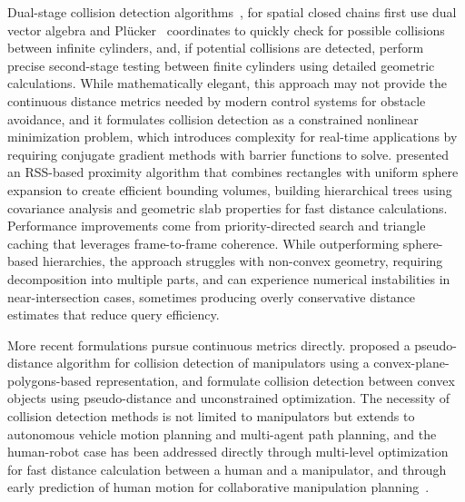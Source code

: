 Dual-stage collision detection algorithms~\cite{ketchel2008self}, for spatial closed chains first use dual vector algebra and Pl\"ucker~\citep{miller2005plucker} coordinates to quickly check for possible collisions between infinite cylinders, and, if potential collisions are detected, perform precise second-stage testing between finite cylinders using detailed geometric calculations. While mathematically elegant, this approach may not provide the continuous distance metrics needed by modern control systems for obstacle avoidance, and it formulates collision detection as a constrained nonlinear minimization problem, which introduces complexity for real-time applications by requiring conjugate gradient methods with barrier functions to solve. \citet{larsen2000fast} presented an RSS-based proximity algorithm that combines rectangles with uniform sphere expansion to create efficient bounding volumes, building hierarchical trees using covariance analysis and geometric slab properties for fast distance calculations. Performance improvements come from priority-directed search and triangle caching that leverages frame-to-frame coherence. While outperforming sphere-based hierarchies, the approach struggles with non-convex geometry, requiring decomposition into multiple parts, and can experience numerical instabilities in near-intersection cases, sometimes producing overly conservative distance estimates that reduce query efficiency.

More recent formulations pursue continuous metrics directly. \citet{xu2020pseudo} proposed a
pseudo-distance algorithm for collision detection of manipulators using a
convex-plane-polygons-based representation, and \citet{xia2024collision} formulate collision
detection between convex objects using pseudo-distance and unconstrained optimization. The necessity
of collision detection methods is not limited to manipulators but extends to autonomous vehicle
motion planning and multi-agent path planning, and the human-robot case has been addressed directly
through multi-level optimization for fast distance calculation between a human and a manipulator,
and through early prediction of human motion for collaborative manipulation
planning~\citep{mainprice2013human}.

